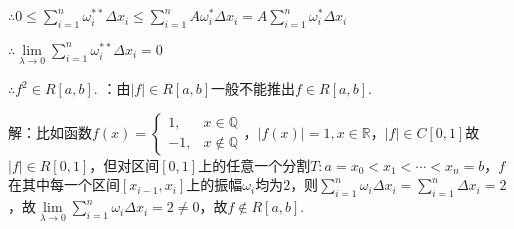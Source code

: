 \documentclass[12pt,UTF8]{ctexart}
\begin{document}
\begin{enumerate}
$\therefore0\leq\sum_{i=1}^n\omega_i^{**}\Delta x_i\leq\sum_{i=1}^nA\omega_i^{*}\Delta x_i=A\sum_{i=1}^n\omega_i^{*}\Delta x_i$

$\therefore\lim\limits_{\lambda\rightarrow0}\sum_{i=1}^n\omega_i^{**}\Delta x_i=0$

$\therefore f^2\in R[a,b]$.
：由$|f|\in R[a,b]$一般不能推出$f\in R[a,b]$.

解：比如函数$f(x)=\begin{cases}
1,&x\in\mathbb Q\\
-1,&x\notin\mathbb Q
\end{cases}$，$|f(x)|=1,x\in\mathbb R$，$|f|\in C[0,1]$故$|f|\in R[0,1]$，但对区间$[0,1]$上的任意一个分割$T:a=x_0<x_1<\cdots<x_n=b$，$f$在其中每一个区间$[x_{i-1},x_i]$上的振幅$\omega_i$均为$2$，则$\sum_{i=1}^n\omega_i\Delta x_i=\sum_{i=1}^n\Delta x_i=2$，故$\lim\limits_{\lambda\rightarrow0}\sum_{i=1}^n\omega_i\Delta x_i=2\neq0$，故$f\notin R[a,b]$.
\end{enumerate}
\end{document}

